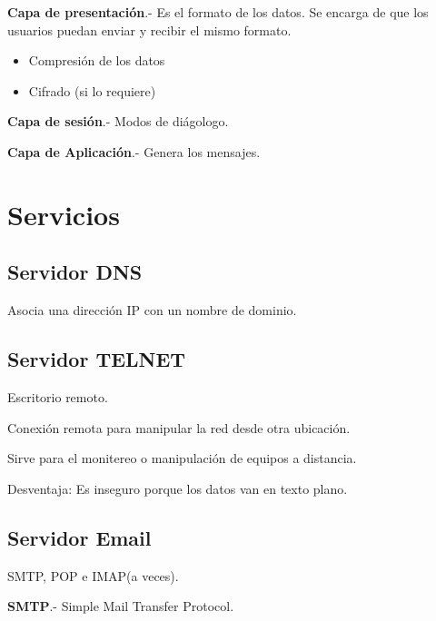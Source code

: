 \documentclass{article}
\begin{document}
\textbf{Capa de presentación}.- Es el formato de los datos. Se encarga de que los
usuarios puedan enviar y recibir el mismo formato.
\vspace{1em}

\begin{itemize}
	\item
	Compresión de los datos
	\item
	Cifrado (si lo requiere)
\end{itemize}
\vspace{1em}

\textbf{Capa de sesión}.- Modos de diágologo.
\vspace{1em}

\textbf{Capa de Aplicación}.- Genera los mensajes.
\vspace{1em}

\section{Servicios}

\subsection{Servidor DNS}

Asocia una dirección IP con un  nombre de dominio.

\subsection{Servidor TELNET}

Escritorio remoto.
\vspace{1em}

Conexión remota para manipular la red desde otra ubicación.
\vspace{1em}

Sirve para el monitereo o manipulación de equipos a distancia.
\vspace{1em}

Desventaja: Es inseguro porque los datos van en texto plano.
\vspace{1em}

\subsection{Servidor Email}

SMTP, POP e IMAP(a veces).
\vspace{1em}

\textbf{SMTP}.- Simple Mail Transfer Protocol.
\vspace{1em}
\end{document}
